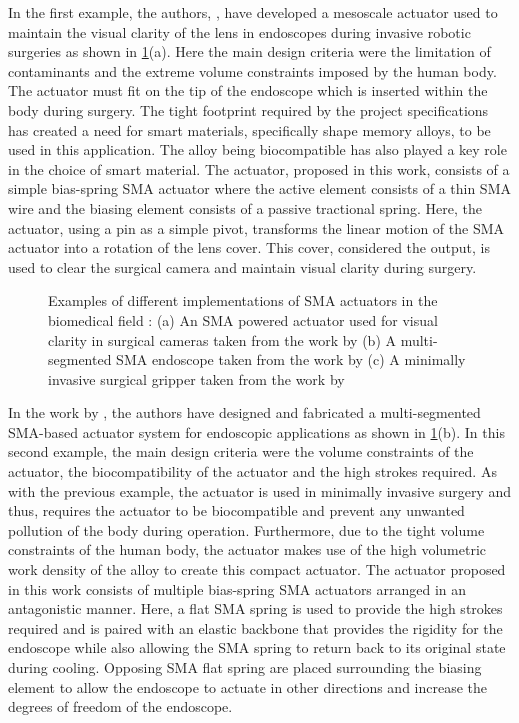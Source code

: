 In the first example, the authors, \cite{liuMesoscaleShapeMemory2019}, have developed a mesoscale actuator used to maintain the visual clarity of the lens in endoscopes during invasive robotic surgeries as shown in \cref{fig:biomed-examples}(a). Here the main design criteria were the limitation of contaminants and the extreme volume constraints imposed by the human body. The actuator must fit on the tip of the endoscope which is inserted within the body during surgery. The tight footprint required by the project specifications has created a need for smart materials, specifically shape memory alloys, to be used in this application. The alloy being biocompatible has also played a key role in the choice of smart material. The actuator, proposed in this work, consists of a simple bias-spring SMA actuator where the active element consists of a thin SMA wire and the biasing element consists of a passive tractional spring. Here, the actuator, using a pin as a simple pivot, transforms the linear motion of the SMA actuator into a rotation of the lens cover. This cover, considered the output, is used to clear the surgical camera and maintain visual clarity during surgery.
\begin{figure}[hbt!]
    \centering
    
    \caption[Examples of different implementations of SMA actuators in the biomedical field]{Examples of different implementations of SMA actuators in the biomedical field : (a) An SMA powered actuator used for visual clarity in surgical cameras taken from the work by \cite{liuMesoscaleShapeMemory2019} (b) A multi-segmented SMA endoscope taken from the work by \cite{abdulkadirMultisegmentedShapeMemory2019b} (c) A minimally invasive surgical gripper taken from the work by \cite{roshanDesignFabricationMinimally2018}}
    \label{fig:biomed-examples}
\end{figure}

In the work by \cite{abdulkadirMultisegmentedShapeMemory2019b}, the authors have designed and fabricated a multi-segmented SMA-based actuator system for endoscopic applications as shown in \cref{fig:biomed-examples}(b). In this second example, the main design criteria were the volume constraints of the actuator, the biocompatibility of the actuator and the high strokes required. As with the previous example, the actuator is used in minimally invasive surgery and thus, requires the actuator to be biocompatible and prevent any unwanted pollution of the body during operation. Furthermore, due to the tight volume constraints of the human body, the actuator makes use of the high volumetric work density of the alloy to create this compact actuator. The actuator proposed in this work consists of multiple bias-spring SMA actuators arranged in an antagonistic manner. Here, a flat SMA spring is used to provide the high strokes required and is paired with an elastic backbone that provides the rigidity for the endoscope while also allowing the SMA spring to return back to its original state during cooling. Opposing SMA flat spring are placed surrounding the biasing element to allow the endoscope to actuate in other directions and increase the degrees of freedom of the endoscope.


